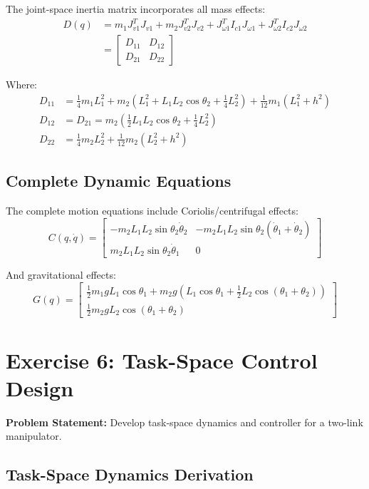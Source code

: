 \documentclass{article}
\begin{document}
The joint-space inertia matrix incorporates all mass effects:
\begin{align}
D(q) &= m_1 J_{v1}^T J_{v1} + m_2 J_{v2}^T J_{v2} + J_{\omega 1}^T I_{c1} J_{\omega 1} + J_{\omega 2}^T I_{c2} J_{\omega 2} \\
&= \begin{bmatrix}
    D_{11} & D_{12} \\
    D_{21} & D_{22}
\end{bmatrix}
\end{align}

Where:
\begin{align}
D_{11} &= \frac{1}{4}m_1 L_1^2 + m_2\left(L_1^2 + L_1 L_2 \cos\theta_2 + \frac{1}{4}L_2^2\right) + \frac{1}{12}m_1(L_1^2 + h^2) \\
D_{12} &= D_{21} = m_2\left(\frac{1}{2}L_1 L_2 \cos\theta_2 + \frac{1}{4}L_2^2\right) \\
D_{22} &= \frac{1}{4}m_2 L_2^2 + \frac{1}{12}m_2(L_2^2 + h^2)
\end{align}

\subsection*{Complete Dynamic Equations}

The complete motion equations include Coriolis/centrifugal effects:
\[
C(q, \dot{q}) = \begin{bmatrix}
    -m_2 L_1 L_2 \sin\theta_2 \dot{\theta}_2 & -m_2 L_1 L_2 \sin\theta_2 (\dot{\theta}_1 + \dot{\theta}_2) \\
    m_2 L_1 L_2 \sin\theta_2 \dot{\theta}_1 & 0
\end{bmatrix}
\]

And gravitational effects:
\[
G(q) = \begin{bmatrix}
    \frac{1}{2} m_1 g L_1 \cos\theta_1 + m_2 g \left(L_1 \cos\theta_1 + \frac{1}{2} L_2 \cos(\theta_1 + \theta_2)\right) \\
    \frac{1}{2} m_2 g L_2 \cos(\theta_1 + \theta_2)
\end{bmatrix}
\]

\section{Exercise 6: Task-Space Control Design}

\textbf{Problem Statement:} Develop task-space dynamics and controller for a two-link manipulator.

\subsection*{Task-Space Dynamics Derivation}
\end{document}
